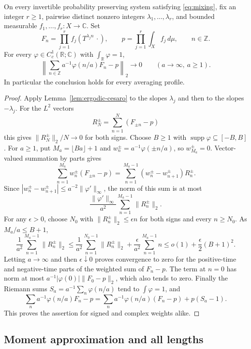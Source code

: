 \begin{lemma}
\label{lem:ergodic-smooth-norm}
On every invertible probability preserving system satisfying
\eqref{eq:mixing}, fix an integer
\(r\geq1\), pairwise distinct nonzero integers
\(\lambda_1,\ldots,\lambda_r\), and bounded measurable
\(f_1,\ldots,f_r:X\to\mathbb C\).  Set
\[
 F_n=\prod_{j=1}^r f_j(T^{\lambda_jn}\,\cdot),\qquad
 p=\prod_{j=1}^r\int_Xf_j\,d\mu,\qquad n\in\mathbb Z.
\]
For every \(\varphi\in C_c^1(\mathbb R;\mathbb C)\) with
\(\int_{\mathbb R}\varphi=1\),
\[
 \left\|\sum_{n\in\mathbb Z}a^{-1}\varphi(n/a)F_n-p\right\|_2
       \longrightarrow0\qquad(a\to\infty,\ a\geq1).
\]
In particular the conclusion holds for every averaging profile.
\end{lemma}

\begin{proof}
Apply Lemma~\ref{lem:ergodic-cesaro} to the slopes \(\lambda_j\) and
then to the slopes \(-\lambda_j\).  For the \(L^2\) vectors
\[
 R_N^\pm=\sum_{n=1}^N(F_{\pm n}-p)
\]
this gives \(\|R_N^\pm\|_2/N\to0\) for both signs.
Choose \(B\geq1\) with
\(\operatorname{supp}\varphi\subseteq[-B,B]\).  For \(a\geq1\), put
\(M_a=\lfloor Ba\rfloor+1\) and
\(w_n^\pm=a^{-1}\varphi(\pm n/a)\), so \(w_{M_a}^\pm=0\).
Vector-valued summation by parts gives
\[
 \sum_{n=1}^{M_a}w_n^\pm(F_{\pm n}-p)
  =\sum_{n=1}^{M_a-1}(w_n^\pm-w_{n+1}^\pm)R_n^\pm.
\]
Since \(|w_n^\pm-w_{n+1}^\pm|\leq a^{-2}\|\varphi'\|_\infty\), the norm
of this sum is at most
\[
 \frac{\|\varphi'\|_\infty}{a^2}
           \sum_{n=1}^{M_a-1}\|R_n^\pm\|_2.
\]
For any \(\epsilon>0\), choose \(N_0\) with
\(\|R_n^\pm\|_2\leq\epsilon n\) for both signs and every \(n\geq N_0\).
As \(M_a/a\leq B+1\),
\[
 \frac1{a^2}\sum_{n=1}^{M_a-1}\|R_n^\pm\|_2
 \leq\frac1{a^2}\sum_{n=1}^{N_0-1}\|R_n^\pm\|_2
       +\frac{\epsilon}{a^2}\sum_{n=1}^{M_a-1}n
 \leq o(1)+\frac{\epsilon}{2}(B+1)^2.
\]
Letting \(a\to\infty\) and then \(\epsilon\downarrow0\) proves convergence
to zero for the positive-time and negative-time parts of the weighted sum
of \(F_n-p\).
The term at \(n=0\) has norm at most
\(a^{-1}|\varphi(0)|\|F_0-p\|_2\), which also tends to zero.
Finally the Riemann sums
\(S_a=a^{-1}\sum_n\varphi(n/a)\) tend to \(\int\varphi=1\), and
\[
 \sum_n a^{-1}\varphi(n/a)F_n-p
   =\sum_n a^{-1}\varphi(n/a)(F_n-p)+p(S_a-1).
\]
This proves the assertion for signed and complex weights alike.
\end{proof}

\subsection{Moment approximation and all lengths}

